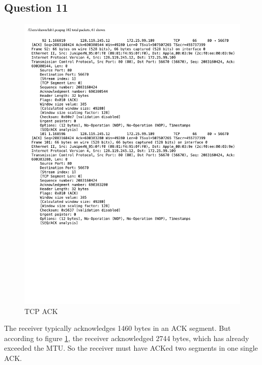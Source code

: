 \documentclass[titlepage, paper=a4, fontsize=11pt]{scrartcl} %
\numberwithin{equation}{section} %
\numberwithin{figure}{section} %
\numberwithin{table}{section} %
\begin{document}
\subsection*{Question 11}
\begin{figure}[!ht]
    \centering
    \includegraphics[width=\textwidth]{images/lab1-q11.pdf}
    \caption{TCP ACK}
    \label{fig:tcp-ack}
\end{figure}
The receiver typically acknowledges 1460 bytes in an ACK segment. But according to figure \ref{fig:tcp-ack}, the receiver acknowledged 2744 bytes, which has already exceeded the MTU. So the receiver must have ACKed two segments in one single ACK. \\
\end{document}
